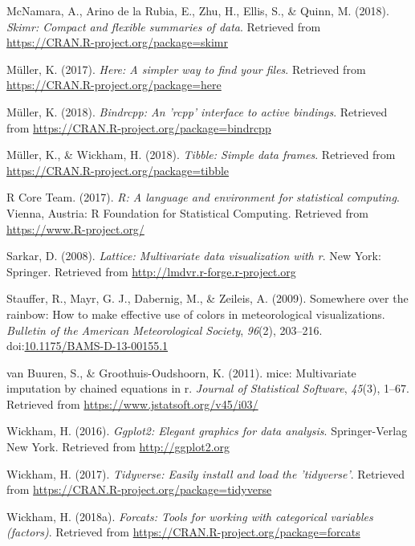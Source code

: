 \documentclass[man]{apa6}
\theoremstyle{definition}
\theoremstyle{definition}
\theoremstyle{definition}
\theoremstyle{remark}
\begin{document}
\hypertarget{ref-R-skimr}{}
McNamara, A., Arino de la Rubia, E., Zhu, H., Ellis, S., \& Quinn, M.
(2018). \emph{Skimr: Compact and flexible summaries of data}. Retrieved
from \url{https://CRAN.R-project.org/package=skimr}

\hypertarget{ref-R-here}{}
Müller, K. (2017). \emph{Here: A simpler way to find your files}.
Retrieved from \url{https://CRAN.R-project.org/package=here}

\hypertarget{ref-R-bindrcpp}{}
Müller, K. (2018). \emph{Bindrcpp: An 'rcpp' interface to active
bindings}. Retrieved from
\url{https://CRAN.R-project.org/package=bindrcpp}

\hypertarget{ref-R-tibble}{}
Müller, K., \& Wickham, H. (2018). \emph{Tibble: Simple data frames}.
Retrieved from \url{https://CRAN.R-project.org/package=tibble}

\hypertarget{ref-R-base}{}
R Core Team. (2017). \emph{R: A language and environment for statistical
computing}. Vienna, Austria: R Foundation for Statistical Computing.
Retrieved from \url{https://www.R-project.org/}

\hypertarget{ref-R-lattice}{}
Sarkar, D. (2008). \emph{Lattice: Multivariate data visualization with
r}. New York: Springer. Retrieved from
\url{http://lmdvr.r-forge.r-project.org}

\hypertarget{ref-R-colorspace_b}{}
Stauffer, R., Mayr, G. J., Dabernig, M., \& Zeileis, A. (2009).
Somewhere over the rainbow: How to make effective use of colors in
meteorological visualizations. \emph{Bulletin of the American
Meteorological Society}, \emph{96}(2), 203--216.
doi:\href{https://doi.org/10.1175/BAMS-D-13-00155.1}{10.1175/BAMS-D-13-00155.1}

\hypertarget{ref-R-mice}{}
van Buuren, S., \& Groothuis-Oudshoorn, K. (2011). mice: Multivariate
imputation by chained equations in r. \emph{Journal of Statistical
Software}, \emph{45}(3), 1--67. Retrieved from
\url{https://www.jstatsoft.org/v45/i03/}

\hypertarget{ref-R-ggplot2}{}
Wickham, H. (2016). \emph{Ggplot2: Elegant graphics for data analysis}.
Springer-Verlag New York. Retrieved from \url{http://ggplot2.org}

\hypertarget{ref-R-tidyverse}{}
Wickham, H. (2017). \emph{Tidyverse: Easily install and load the
'tidyverse'}. Retrieved from
\url{https://CRAN.R-project.org/package=tidyverse}

\hypertarget{ref-R-forcats}{}
Wickham, H. (2018a). \emph{Forcats: Tools for working with categorical
variables (factors)}. Retrieved from
\url{https://CRAN.R-project.org/package=forcats}
\end{document}
